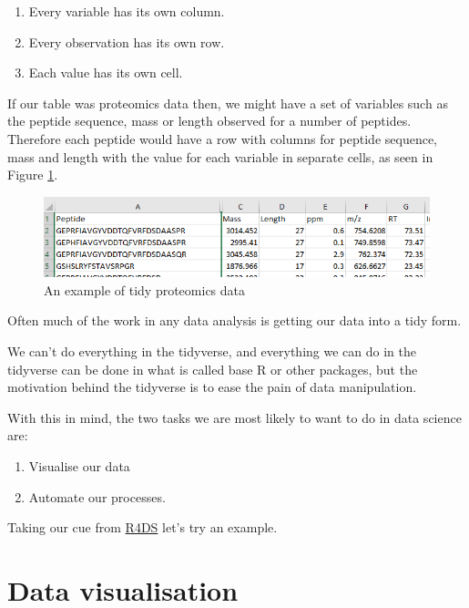 \documentclass[12pt,]{book}
\providecommand{\tightlist}{%
  \setlength{\itemsep}{0pt}\setlength{\parskip}{0pt}}
\begin{document}
\begin{enumerate}
\def\labelenumi{\arabic{enumi}.}
\tightlist
\item
  Every variable has its own column.
\item
  Every observation has its own row.
\item
  Each value has its own cell.
\end{enumerate}

If our table was proteomics data then, we might have a set of variables such
as the peptide sequence, mass or length observed for a number of peptides.
Therefore each peptide would have a row with columns for peptide sequence, mass
and length with the value for each variable in separate cells, as
seen in Figure \ref{fig:tidy-prot}.



\begin{figure}

{\centering \includegraphics[width=0.8\linewidth]{img/tidy_prot_data} 

}

\caption{An example of tidy proteomics data}\label{fig:tidy-prot}
\end{figure}

Often much of the work in any data analysis is getting our data into a tidy form.

We can't do everything in the tidyverse, and everything we can do in the
tidyverse can be done in what is called base R or other packages, but the
motivation behind the tidyverse is to ease the pain of data manipulation.

With this in mind, the two tasks we are most likely to want to do
in data science are:

\begin{enumerate}
\def\labelenumi{\arabic{enumi}.}
\tightlist
\item
  Visualise our data
\item
  Automate our processes.
\end{enumerate}

Taking our cue from \href{http://r4ds.had.co.nz/}{R4DS} let's try an example.

\hypertarget{data-visualisation}{%
\section{Data visualisation}\label{data-visualisation}}
\end{document}
